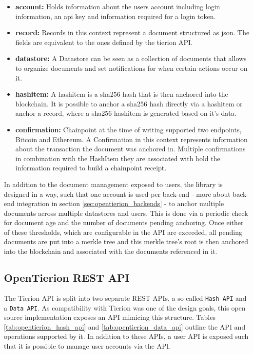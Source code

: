 \documentclass[12pt,msc,a4paper,oneside]{ucl_thesis}
\begin{document}
\begin{itemize}
    \item \textbf{account:} Holds information about the users account including login information, an api key and information required for a login token.

    \item \textbf{record:} Records in this context represent a document structured as json. The fields are equivalent to the ones defined by the tierion API.

    \item \textbf{datastore:} A Datastore can be seen as a collection of documents that allows to organize documents and set notifications for when certain actions occur on it.

    \item \textbf{hashitem:} A hashitem is a sha256 hash that is then anchored into the blockchain. It is possible to anchor a sha256 hash directly via a hashitem or anchor a record, where a sha256 hashitem is generated based on it's data.

    \item \textbf{confirmation:} Chainpoint at the time of writing supported two endpoints, Bitcoin and Ethereum. A Confirmation in this context represents information about the transaction the document was anchored in. Multiple confirmations in combination with the HashItem they are associated with hold the information required to build a chainpoint receipt.
\end{itemize}
In addition to the document management exposed to users, the library is designed in a way, such that one account is used per back-end - more about back-end integration in section \ref{sec:opentierion_backends} - to anchor multiple documents across multiple datastores and users. This is done via a periodic check for document age and the number of documents pending anchoring. Once either of these thresholds, which are configurable in the API are exceeded, all pending documents are put into a merkle tree and this merkle tree's root is then anchored into the blockchain and associated with the documents referenced in it.

\subsection{OpenTierion REST API} \label{sec:opentierion_rest_api}
The Tierion API is split into two separate REST APIs, a so called \texttt{Hash API} and a \texttt{Data API}. As compatibility with Tierion was one of the design goals, this open source implementation exposes an API mimicing this structure. Tables \ref{tab:opentierion_hash_api} and \ref{tab:opentierion_data_api} outline the API and operations supported by it. In addition to these APIs, a user API is exposed such that it is possible to manage user accounts via the API.
\end{document}
